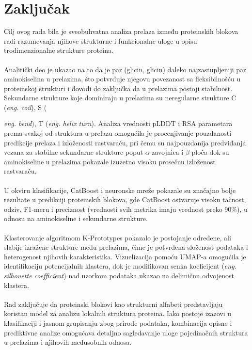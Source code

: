 \documentclass[a4paper,12pt]{article}
\begin{document}
\section{Zaključak}
Cilj ovog rada bila je sveobuhvatna analiza prelaza između proteinskih blokova radi razumevanja njihove strukturne i funkcionalne uloge u opisu trodimenzionalne strukture proteina.\\
\\
Analitički deo je ukazao na to da je par (glicin, glicin) daleko najzastupljeniji par aminokiselina u prelazima, što potvrđuje njegovu povezanost sa fleksibilnošću u proteinskoj strukturi i dovodi do zaključka da u prelazima postoji stabilnost. Sekundarne strukture koje dominiraju u prelazima su neregularne strukture C (\textit{eng. coil}), S ({\textit{eng. bend}), T ({\textit{eng. helix turn}}). Analiza vrednosti pLDDT i RSA parametara prema svakoj od struktura u prelazu omogućila je procenjivanje pouzdanosti predikcije prelaza i izloženosti rastvaraču, pri čemu su najpouzdanija predviđanja vezana za stabilne sekundarne strukture poput $\alpha$-zavojnica i $\beta$-ploča dok su aminokiseline u prelazima pokazale izuzetno visoku prosečnu izloženost rastvaraču.\\
\\
U okviru klasifikacije, CatBoost i neuronske mreže pokazale su značajno bolje rezultate u predikciji proteinskih blokova, gde CatBoost ostvaruje visoku tačnost, odziv, F1-meru i preciznost (vrednosti svih metrika imaju vrednost preko 90\%), u odnosu na aminokiseline i sekundarne strukture.\\
\\
Klasterovanje algoritmom K-Prototypes pokazalo je postojanje određene, ali slabije izražene strukture među prelazima, čime je potvrđena složenost podataka i heterogenost njihovih karakteristika. Vizuelizacija pomoću UMAP-a omogućila je identifikaciju potencijalnih klastera, dok je modifikovan senka koeficijent (\textit{eng. silhouette coefficient}) nad uzorkom podataka ukazao na delimičnu odvojenost klastera.\\
\\
Rad zaključuje da proteinski blokovi kao strukturni alfabeti predstavljaju koristan model za analizu lokalnih struktura proteina. Iako postoje izazovi u klasifikaciji i jasnom grupisanju zbog prirode podataka, kombinacija opisne i prediktivne analize omogućava detaljno sagledavanje uloge pojedinačnih struktura u prelazima i njihovih međusobnih odnosa.

}
\end{document}

